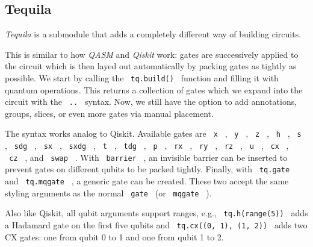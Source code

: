 
\subsection{Tequila}\label{tequila}

\emph{Tequila} is a submodule that adds a completely different way of
building circuits.

\begin{Shaded}
\begin{Highlighting}[]

\NormalTok{  ),}
\NormalTok{)}
\end{Highlighting}
\end{Shaded}

This is similar to how \emph{QASM} and \emph{Qiskit} work: gates are
successively applied to the circuit which is then layed out
automatically by packing gates as tightly as possible. We start by
calling the \texttt{\ tq.build()\ } function and filling it with quantum
operations. This returns a collection of gates which we expand into the
circuit with the \texttt{\ ..\ } syntax. Now, we still have the option
to add annotations, groups, slices, or even more gates via manual
placement.

The syntax works analog to Qiskit. Available gates are \texttt{\ x\ } ,
\texttt{\ y\ } , \texttt{\ z\ } , \texttt{\ h\ } , \texttt{\ s\ } ,
\texttt{\ sdg\ } , \texttt{\ sx\ } , \texttt{\ sxdg\ } , \texttt{\ t\ }
, \texttt{\ tdg\ } , \texttt{\ p\ } , \texttt{\ rx\ } , \texttt{\ ry\ }
, \texttt{\ rz\ } , \texttt{\ u\ } , \texttt{\ cx\ } , \texttt{\ cz\ } ,
and \texttt{\ swap\ } . With \texttt{\ barrier\ } , an invisible barrier
can be inserted to prevent gates on different qubits to be packed
tightly. Finally, with \texttt{\ tq.gate\ } and \texttt{\ tq.mqgate\ } ,
a generic gate can be created. These two accept the same styling
arguments as the normal \texttt{\ gate\ } (or \texttt{\ mqgate\ } ).

Also like Qiskit, all qubit arguments support ranges, e.g.,
\texttt{\ tq.h(range(5))\ } adds a Hadamard gate on the first five
qubits and \texttt{\ tq.cx((0,\ 1),\ (1,\ 2))\ } adds two CX gates: one
from qubit 0 to 1 and one from qubit 1 to 2.

